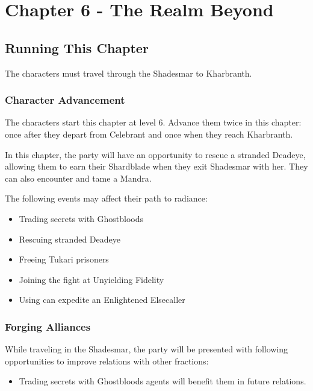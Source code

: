 \chapter{Chapter 6 - The Realm Beyond}
\label{chap:chapter6}

\setcounter{section}{-1}
\section{Running This Chapter}

The characters must travel through the Shadesmar to Kharbranth.



\subsection{Character Advancement}

The characters start this chapter at level 6. Advance them twice in this chapter: once after they depart from Celebrant and once when they reach Kharbranth.

In this chapter, the party will have an opportunity to rescue a stranded Deadeye, allowing them to earn their Shardblade when they exit Shadesmar with her. They can also encounter and tame a Mandra.

The following events may affect their path to radiance:
\begin{itemize}
	\item Trading secrets with Ghostbloods
	\item Rescuing stranded Deadeye
	\item Freeing Tukari prisoners
	\item Joining the fight at Unyielding Fidelity
	\item Using \lootGateOpener{} can expedite an Enlightened Elsecaller
\end{itemize}



\subsection{Forging Alliances}

While traveling in the Shadesmar, the party will be presented with following opportunities to improve relations with other fractions:

\begin{itemize}
	\item Trading secrets with Ghostbloods agents will benefit them in future relations.
\end{itemize}



